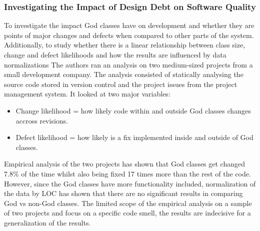 \documentclass{mprop}
\begin{document}
\subsubsection{Investigating the Impact of Design Debt on Software Quality} \cite{Zazworka2011}
To investigate the impact God classes have on development and whether they are points of major changes and defects when compared to other parts of the system. Additionally, to study whether there is a linear relationship between class size, change and defect likelihoods and how the results are influenced by data normalizations
The authors ran an analysis on two medium-sized projects from a small development company. The analysis consisted of statically analysing the source code stored in version control and the project issues from the project management system.
It looked at two major variables:
\begin{itemize}
\item Change likelihood = how likely code within and outside God classes changes accross revisions.
\item Defect likelihood = how likely is a fix implemented inside and outside of God classes.
\end{itemize}
Empirical analysis of the two projects has shown that God classes get changed 7.8\% of the time whilst also being fixed 17 times more than the rest of the code.
However, since the God classes have more functionality included, normalization of the data by LOC has shown that there are no significant results in comparing God vs non-God classes.
The limited scope of the empirical analysis on a sample of two projects and focus on a specific code smell, the results are indecisive for a generalization of the results.
\end{document}
